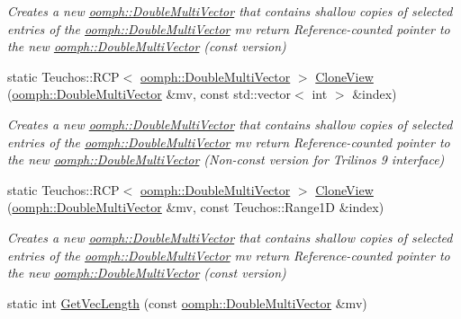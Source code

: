 \begin{DoxyCompactItemize}
\begin{DoxyCompactList}\small\item\em Creates a new \hyperlink{classoomph_1_1DoubleMultiVector}{oomph\+::\+Double\+Multi\+Vector} that contains shallow copies of selected entries of the \hyperlink{classoomph_1_1DoubleMultiVector}{oomph\+::\+Double\+Multi\+Vector} mv return Reference-\/counted pointer to the new \hyperlink{classoomph_1_1DoubleMultiVector}{oomph\+::\+Double\+Multi\+Vector} (const version) \end{DoxyCompactList}\item 
static Teuchos\+::\+R\+CP$<$ \hyperlink{classoomph_1_1DoubleMultiVector}{oomph\+::\+Double\+Multi\+Vector} $>$ \hyperlink{classAnasazi_1_1MultiVecTraits_3_01double_00_01oomph_1_1DoubleMultiVector_01_4_ac7847ef48e8b7577a7c66c57d82a614b}{Clone\+View} (\hyperlink{classoomph_1_1DoubleMultiVector}{oomph\+::\+Double\+Multi\+Vector} \&mv, const std\+::vector$<$ int $>$ \&index)
\begin{DoxyCompactList}\small\item\em Creates a new \hyperlink{classoomph_1_1DoubleMultiVector}{oomph\+::\+Double\+Multi\+Vector} that contains shallow copies of selected entries of the \hyperlink{classoomph_1_1DoubleMultiVector}{oomph\+::\+Double\+Multi\+Vector} mv return Reference-\/counted pointer to the new \hyperlink{classoomph_1_1DoubleMultiVector}{oomph\+::\+Double\+Multi\+Vector} (Non-\/const version for Trilinos 9 interface) \end{DoxyCompactList}\item 
static Teuchos\+::\+R\+CP$<$ \hyperlink{classoomph_1_1DoubleMultiVector}{oomph\+::\+Double\+Multi\+Vector} $>$ \hyperlink{classAnasazi_1_1MultiVecTraits_3_01double_00_01oomph_1_1DoubleMultiVector_01_4_a5499226f6f89fa68f1ba3e706d6c4642}{Clone\+View} (\hyperlink{classoomph_1_1DoubleMultiVector}{oomph\+::\+Double\+Multi\+Vector} \&mv, const Teuchos\+::\+Range1D \&index)
\begin{DoxyCompactList}\small\item\em Creates a new \hyperlink{classoomph_1_1DoubleMultiVector}{oomph\+::\+Double\+Multi\+Vector} that contains shallow copies of selected entries of the \hyperlink{classoomph_1_1DoubleMultiVector}{oomph\+::\+Double\+Multi\+Vector} mv return Reference-\/counted pointer to the new \hyperlink{classoomph_1_1DoubleMultiVector}{oomph\+::\+Double\+Multi\+Vector} (const version) \end{DoxyCompactList}\item 
static int \hyperlink{classAnasazi_1_1MultiVecTraits_3_01double_00_01oomph_1_1DoubleMultiVector_01_4_a0f59461c4b9163eca79807a349deb4ea}{Get\+Vec\+Length} (const \hyperlink{classoomph_1_1DoubleMultiVector}{oomph\+::\+Double\+Multi\+Vector} \&mv)

\end{DoxyCompactItemize}
